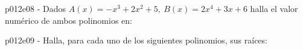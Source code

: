 \documentclass[spanish, 11pt]{exam}
\begin{document}
\begin{questions}
\begin{multicols}{1}
\begin{parts}
        \end{parts}
        \end{multicols}
        \question p012e08 - Dados $ A(x)= - {x^3} + 2{x^2} + 5, \  B(x)= 2{x^4} + 3x + 6$ halla el valor numérico de ambos polinomios en:
        \begin{multicols}{3} 
        \end{multicols}
        \question p012e09 - Halla, para cada uno  de los siguientes polinomios, sus raíces:
        \begin{multicols}{3} 

\end{multicols}
\end{questions}
\end{document}
